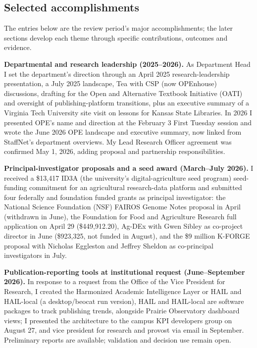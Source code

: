 \subsection{Selected accomplishments}
The entries below are the review period's major accomplishments; the later sections develop each theme through specific contributions, outcomes and evidence.

\textbf{Departmental and research leadership (2025--2026).} As Department Head I set the department's direction through an April 2025 research-leadership presentation, a July 2025 landscape, Tea with CSP (now OPEnhouse) discussions, drafting for the Open and Alternative Textbook Initiative (OATI) and oversight of publishing-platform transitions, plus an executive summary of a Virginia Tech University site visit on lessons for Kansas State Libraries. In 2026 I presented OPE's name and direction at the February 3 First Tuesday session and wrote the June 2026 OPE landscape and executive summary, now linked from StaffNet's department overviews. My Lead Research Officer agreement was confirmed May 1, 2026, adding proposal and partnership responsibilities.

\textbf{Principal-investigator proposals and a seed award (March--July 2026).} I received a \$13,417 ID3A (the university's digital-agriculture seed program) seed-funding commitment for an agricultural research-data platform and submitted four federally and foundation funded grants as principal investigator: the National Science Foundation (NSF) FAIROS Genome Notes proposal in April (withdrawn in June), the Foundation for Food and Agriculture Research full application on April 29 (\$449,912.20), Ag-DEx with Gwen Sibley as co-project director in June (\$923,325, not funded in August), and the \$9 million K-FORGE proposal with Nicholas Eggleston and Jeffrey Sheldon as co-principal investigators in July.

\textbf{Publication-reporting tools at institutional request (June--September 2026).} In response to a request from the Office of the Vice President for Research, I created the Harmonized Academic Intelligence Layer or HAIL and HAIL-local (a desktop/beocat run version), HAIL and HAIL-local are software packages to track publishing trends, alongside Prairie Observatory dashboard views; I presented the architecture to the campus KPI developers group on August 27, and vice president for research and provost via email in September. Preliminary reports are available; validation and decision use remain open.

